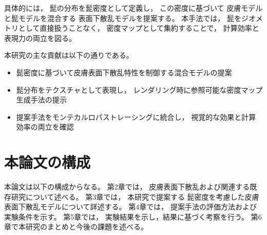 具体的には，
髭の分布を髭密度として定義し，
この密度に基づいて
皮膚モデルと髭モデルを混合する
表面下散乱モデルを提案する。
本手法では，
髭をジオメトリとして直接扱うことなく，
密度マップとして集約することで，
計算効率と表現力の両立を図る。

本研究の主な貢献は以下の通りである。
\begin{itemize}
  \item 髭密度に基づいて皮膚表面下散乱特性を制御する混合モデルの提案
  \item 髭分布をテクスチャとして表現し，
        レンダリング時に参照可能な密度マップ生成手法の提示
  \item 提案手法をモンテカルロパストレーシングに統合し，
        視覚的な効果と計算効率の両立を確認
\end{itemize}

\section{本論文の構成}
本論文は以下の構成からなる。
第2章では，
皮膚表面下散乱および関連する既存研究について述べる。
第3章では，
本研究で提案する
髭密度を考慮した皮膚表面下散乱モデルについて詳述する。
第4章では，
提案手法の評価方法および実験条件を示す。
第5章では，
実験結果を示し，結果に基づく考察を行う。
第6章で本研究のまとめと今後の課題を述べる。

